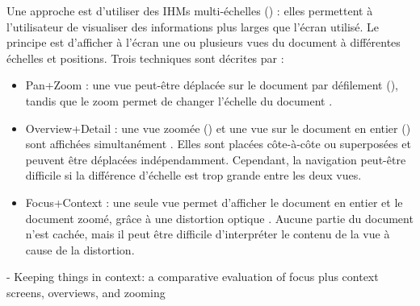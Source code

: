 Une approche est d'utiliser des IHMs multi-échelles () : elles permettent à l'utilisateur de visualiser des informations plus larges que l'écran utilisé. Le principe est d'afficher à l'écran une ou plusieurs vues du document à différentes échelles et positions. Trois techniques sont décrites par \cite{Guiard2004} :
\begin{itemize}
  \item Pan+Zoom : une vue peut-être déplacée sur le document par défilement (), tandis que le zoom permet de changer l'échelle du document .
  \item Overview+Detail : une vue zoomée () et une vue sur le document en entier () sont affichées simultanément . Elles sont placées côte-à-côte ou superposées et peuvent être déplacées indépendamment. Cependant, la navigation peut-être difficile si la différence d'échelle est trop grande entre les deux vues.
  \item Focus+Context : une seule vue permet d'afficher le document en entier et le document zoomé, grâce à une distortion optique . Aucune partie du document n'est cachée, mais il peut être difficile d'interpréter le contenu de la vue à cause de la distortion.
\end{itemize}


\cite{Baudisch2002} - Keeping things in context: a comparative evaluation of focus plus context screens, overviews, and zooming


